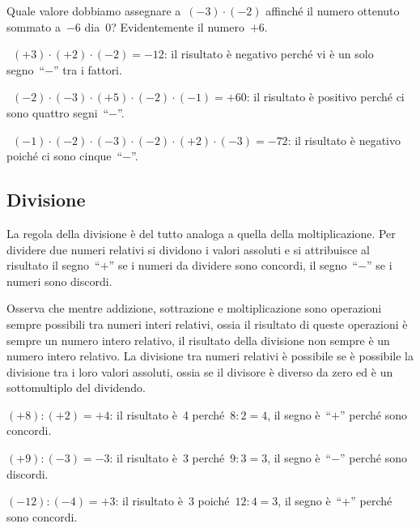 Quale valore dobbiamo assegnare a~$(-3)\cdot(-2)$ affinché il numero ottenuto sommato a~$-6$ dia~0?
Evidentemente il numero~$+6$.

\begin{exrig}
 \begin{esempio}
~$(+3)\cdot (+2)\cdot (-2) =-12$: il risultato è negativo perché vi è un solo segno~``$-$'' tra i fattori.
 \end{esempio}

 \begin{esempio}
~$(-2)\cdot (-3)\cdot (+5)\cdot (-2)\cdot (-1) = +60$: il risultato è positivo perché ci sono quattro segni~``$-$''.
 \end{esempio}

 \begin{esempio}
~$(-1)\cdot (-2)\cdot (-3)\cdot (-2)\cdot (+2)\cdot (-3) = -72$: il risultato è negativo poiché ci sono cinque~``$-$''.
 \end{esempio}
\end{exrig}

\ovalbox{\risolvii \ref{ese:2.16}, \ref{ese:2.17}, \ref{ese:2.18}}

\subsection{Divisione}

La regola della divisione è del tutto analoga a quella della moltiplicazione.
Per dividere due numeri relativi si dividono i valori assoluti e si attribuisce
al risultato il segno~``$+$'' se i numeri da dividere sono concordi, il segno~``$-$'' se i numeri sono discordi.

Osserva che mentre addizione, sottrazione e moltiplicazione sono operazioni sempre possibili
tra numeri interi relativi, ossia il risultato di queste operazioni è sempre un numero intero
relativo, il risultato della divisione non sempre è un numero intero relativo. La divisione
tra numeri relativi è possibile se è possibile la divisione tra i loro valori assoluti, ossia se
il divisore è diverso da zero ed è un sottomultiplo del dividendo.
\pagebreak
\begin{exrig}
 \begin{esempio}
$(+8):(+2)=+4$: il risultato è~4 perché~$8:2=4$, il segno è~``$+$'' perché sono concordi.
 \end{esempio}

\begin{esempio}
$(+9):(-3)=-3$: il risultato è~3 perché~$9:3=3$, il segno è~``$-$'' perché sono discordi.
 \end{esempio}

\begin{esempio}
$(-12):(-4)=+3$: il risultato è~3 poiché~$12:4=3$, il segno è~``$+$'' perché sono concordi.
 \end{esempio}

\end{exrig}

